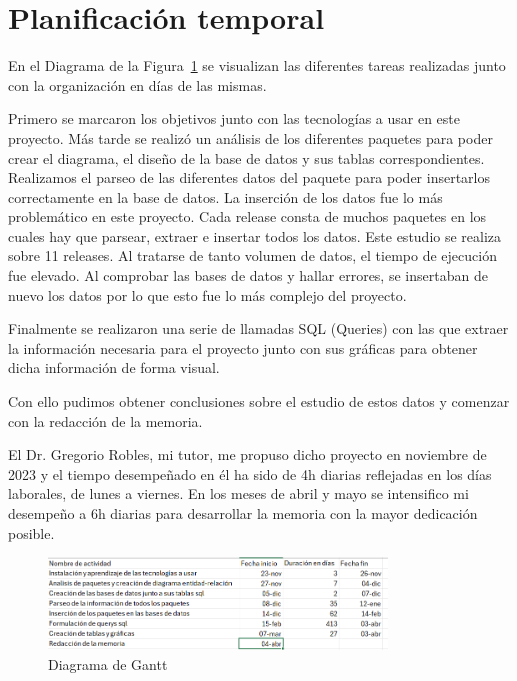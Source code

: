 \documentclass[a4paper, 12pt]{book}
\begin{document}
\section{Planificación temporal}
\label{sec:planificacion-temporal}

En el Diagrama de la Figura~\ref{fig:diagrama_gantt} se visualizan las diferentes tareas realizadas junto con la organización en días de las mismas. 

Primero se marcaron los objetivos junto con las tecnologías a usar en este proyecto.
Más tarde se realizó un análisis de los diferentes paquetes para poder crear el diagrama, el diseño de la base de datos y sus tablas correspondientes.
Realizamos el parseo de las diferentes datos del paquete para poder insertarlos correctamente en la base de datos.
La inserción de los datos fue lo más problemático en este proyecto. Cada release consta de muchos paquetes en los cuales hay que parsear, extraer e insertar todos los datos. Este estudio se realiza sobre 11 releases. Al tratarse de tanto volumen de datos, el tiempo de ejecución fue elevado. Al comprobar las bases de datos y hallar errores, se insertaban de nuevo los datos por lo que esto fue lo más complejo del proyecto.

Finalmente se realizaron una serie de llamadas SQL (Queries) con las que extraer la información necesaria para el proyecto junto con sus gráficas para obtener dicha información de forma visual.

Con ello pudimos obtener conclusiones sobre el estudio de estos datos y comenzar con la redacción de la memoria.

El Dr. Gregorio Robles, mi tutor, me propuso dicho proyecto en noviembre de 2023 y el tiempo desempeñado en él ha sido de 4h diarias reflejadas en los días laborales, de lunes a viernes. En los meses de abril y mayo se intensifico mi desempeño a 6h diarias para desarrollar la memoria con la mayor dedicación posible.

\begin{figure}
	\centering
	\includegraphics[width=9cm, keepaspectratio]{img/Gantt.png}
	\caption{Diagrama de Gantt}
	\label{fig:diagrama_gantt}
\end{figure}

\end{document}
